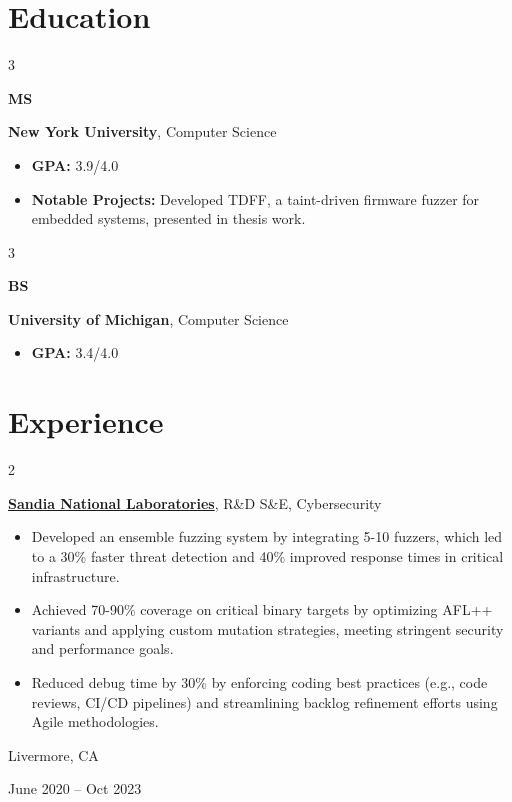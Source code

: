 \documentclass[10pt, a4paper]{article}
\newenvironment{highlights}{
    \begin{itemize}[
        topsep=0.1 cm,
        parsep=0.1 cm,
        partopsep=0pt,
        itemsep=0pt,
        leftmargin=0.2 cm + 10pt
    ]
}{
    \end{itemize}
} %
\newenvironment{twocolentry}[2][]{
    \onecolentry
    \def\secondColumn{#2}
    \setcolumnwidth{\fill, 4 cm}
    \begin{paracol}{2}
}{
    \switchcolumn \raggedleft \secondColumn
    \end{paracol}
    \endonecolentry
} %
\newenvironment{threecolentry}[3][]{
    \onecolentry
    \def\thirdColumn{#3}
    \setcolumnwidth{1 cm, \fill, 4 cm}
    \begin{paracol}{3}
    {\raggedright #2} \switchcolumn
}{
    \switchcolumn \raggedleft \thirdColumn
    \end{paracol}
    \endonecolentry
} %
\begin{document}
    
    \section{Education}



        
        \begin{threecolentry}{\textbf{MS}}{
            2020
        }
            \textbf{New York University}, Computer Science
            \begin{highlights}
                \item \textbf{GPA:} 3.9/4.0
                \item \textbf{Notable Projects:} Developed TDFF, a taint-driven firmware fuzzer for embedded systems, presented in thesis work.
            \end{highlights}
        \end{threecolentry}

        \vspace{0.5 cm}

        \begin{threecolentry}{\textbf{BS}}{
            2018
        }
            \textbf{University of Michigan}, Computer Science
            \begin{highlights}
                \item \textbf{GPA:} 3.4/4.0
            \end{highlights}
        \end{threecolentry}


    
    \section{Experience}



        
        \begin{twocolentry}{
            Livermore, CA

        June 2020 – Oct 2023
        }
            \textbf{\href{https://sandia.gov}{Sandia National Laboratories}}, R\&D S\&E, Cybersecurity
            \begin{highlights}
                \item Developed an ensemble fuzzing system by integrating 5-10 fuzzers, which led to a 30\% faster threat detection and 40\% improved response times in critical infrastructure.
                \item Achieved 70-90\% coverage on critical binary targets by optimizing AFL++ variants and applying custom mutation strategies, meeting stringent security and performance goals.
                \item Reduced debug time by 30\% by enforcing coding best practices (e.g., code reviews, CI/CD pipelines) and streamlining backlog refinement efforts using Agile methodologies.
            \end{highlights}
        \end{twocolentry}
\end{document}
